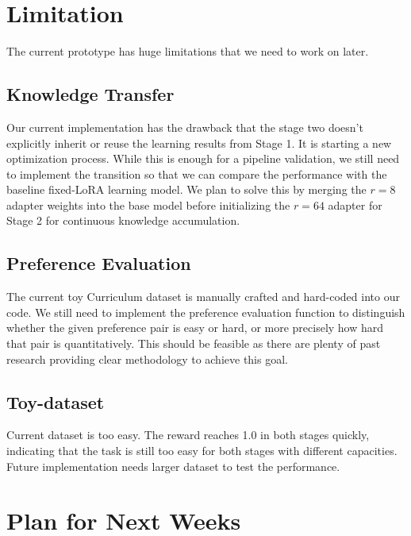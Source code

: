 \documentclass{article}
\begin{document}
\section{Limitation}
The current prototype has huge limitations that we need to work on later.

\subsection{Knowledge Transfer}
Our current implementation has the drawback that the stage two doesn't explicitly inherit or reuse the learning results from Stage 1. It is starting a new optimization process. While this is enough for a pipeline validation, we still need to implement the transition so that we can compare the performance with the baseline fixed-LoRA learning model. We plan to solve this by merging the $r=8$ adapter weights into the base model before initializing the $r=64$ adapter for Stage 2 for continuous knowledge accumulation.

\subsection{Preference Evaluation}
The current toy Curriculum dataset is manually crafted and hard-coded into our code. We still need to implement the preference evaluation function to distinguish whether the given preference pair is easy or hard, or more precisely how hard that pair is quantitatively. This should be feasible as there are plenty of past research providing clear methodology to achieve this goal.

\subsection{Toy-dataset}
Current dataset is too easy. The reward reaches 1.0 in both stages quickly, indicating that the task is still too easy for both stages with different capacities. Future implementation needs larger dataset to test the performance.

\section{Plan for Next Weeks}
\end{document}
